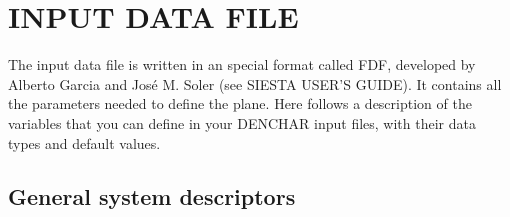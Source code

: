 \section{INPUT DATA FILE}

The input data file is written in an special format called FDF, developed
by Alberto Garcia and Jos\'e M. Soler (see SIESTA USER'S GUIDE).
It contains all the parameters needed to define the plane.
Here follows a description of the variables that you can define in your 
DENCHAR input files,
with their data types and default values.

\vspace{5pt}
\subsection{General system descriptors}

